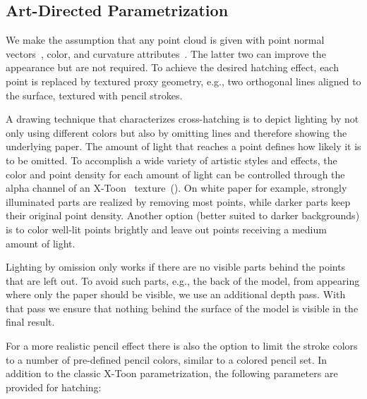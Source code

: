 \documentclass[a4paper,twoside]{article}
\newcommand{\eg}{e.g.,\xspace}
\begin{document}
\subsection{Art-Directed Parametrization}
\label{PCNPR:SubSec:ConceptualOverview}
%
We make the assumption that any point cloud is given with point normal vectors~\cite{Cao2021}, color, and curvature attributes~\cite{Merigot2009,Lu2020}.
The latter two can improve the appearance but are not required.
To achieve the desired hatching effect, each point is replaced by textured proxy geometry, \eg two orthogonal lines aligned to the surface, textured with pencil strokes.

A drawing technique that characterizes cross-hatching is to depict lighting by not only using different colors but also by omitting lines and therefore showing the underlying paper.
The amount of light that reaches a point defines how likely it is to be omitted. 
To accomplish a wide variety of artistic styles and effects, the color and point density for each amount of light can be controlled through the alpha channel of an X-Toon~\cite{Barla2006,Kang2009} texture~().
On white paper for example, strongly illuminated parts are realized by removing most points, while darker parts keep their original point density.
Another option (better suited to darker backgrounds) is to color well-lit points brightly and leave out points receiving a medium amount of light.

Lighting by omission only works if there are no visible parts behind the points that are left out.
To avoid such parts, \eg the back of the model, from appearing where only the paper should be visible, we use an additional depth pass. With that pass we ensure that nothing behind the surface of the model is visible in the final result.

For a more realistic pencil effect there is also the option to limit the stroke colors to a number of pre-defined pencil colors, similar to a colored pencil set.
In addition to the classic X-Toon parametrization, the following parameters are provided for hatching:
\end{document}
